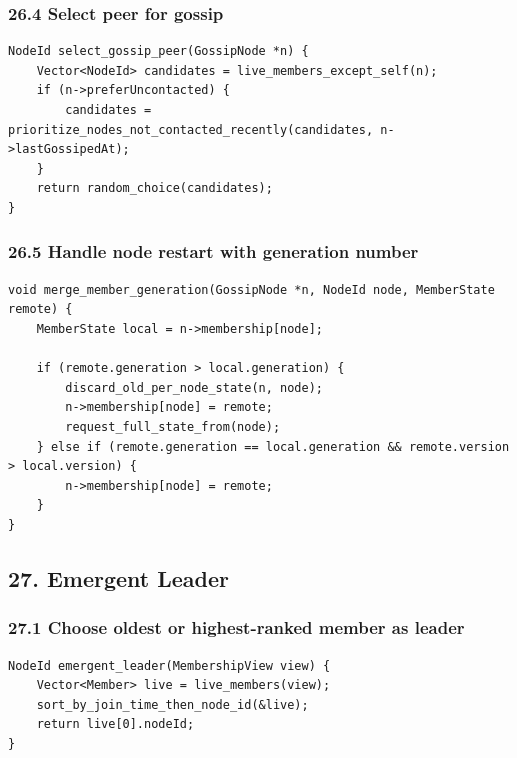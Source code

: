 \documentclass[10pt,letterpaper]{article}
\begin{document}
\subsubsection*{26.4 Select peer for gossip}

\begin{verbatim}
NodeId select_gossip_peer(GossipNode *n) {
    Vector<NodeId> candidates = live_members_except_self(n);
    if (n->preferUncontacted) {
        candidates = prioritize_nodes_not_contacted_recently(candidates, n->lastGossipedAt);
    }
    return random_choice(candidates);
}
\end{verbatim}

\subsubsection*{26.5 Handle node restart with generation number}

\begin{verbatim}
void merge_member_generation(GossipNode *n, NodeId node, MemberState remote) {
    MemberState local = n->membership[node];

    if (remote.generation > local.generation) {
        discard_old_per_node_state(n, node);
        n->membership[node] = remote;
        request_full_state_from(node);
    } else if (remote.generation == local.generation && remote.version > local.version) {
        n->membership[node] = remote;
    }
}
\end{verbatim}

\subsection*{27. Emergent Leader}

\subsubsection*{27.1 Choose oldest or highest-ranked member as leader}

\begin{verbatim}
NodeId emergent_leader(MembershipView view) {
    Vector<Member> live = live_members(view);
    sort_by_join_time_then_node_id(&live);
    return live[0].nodeId;
}
\end{verbatim}
\end{document}
